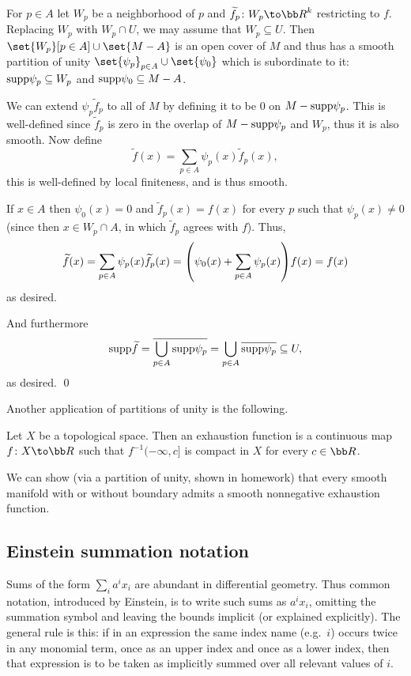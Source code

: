 \elemm

\bproof

    For $p\in A$ let $W_p$ be a neighborhood of $p$ and $\tilde f_p\colon W_p\to\bR^k$ restricting to $f$.
    Replacing $W_p$ with $W_p\cap U$, we may assume that $W_p\subseteq U$.
    Then $\set{W_p}[p\in A]\cup\set{M-A}$ is an open cover of $M$ and thus has a smooth partition of unity $\set{\psi_p}_{p\in A}\cup\set{\psi_0}$
    which is subordinate to it: ${\rm supp}\psi_p\subseteq W_p$ and ${\rm supp}\psi_0\subseteq M-A$.

    We can extend $\psi_p\tilde f_p$ to all of $M$ by defining it to be $0$ on $M-{\rm supp}\psi_p$.
    This is well-defined since $\tilde f_p$ is zero in the overlap of $M-{\rm supp}\psi_p$ and $W_p$, thus it is also smooth.
    Now define
    $$ \tilde f(x) = \sum_{p\in A}\psi_p(x)\tilde f_p(x) , $$
    this is well-defined by local finiteness, and is thus smooth.

    If $x\in A$ then $\psi_0(x)=0$ and $\tilde f_p(x)=f(x)$ for every $p$ such that $\psi_p(x)\neq0$ (since then $x\in W_p\cap A$, in which
    $\tilde f_p$ agrees with $f$).
    Thus,
    $$ \widetilde f(x) = \sum_{p\in A}\psi_p(x)\widetilde f_p(x) = \mathopen{}\mathclose{\left(\psi_0(x) + \sum_{p\in A}\psi_p(x)\right)}f(x) = f(x) $$
    as desired.

    And furthermore
    $$ {\rm supp}\widetilde f = \overline{\bigcup_{p\in A}{\rm supp}\psi_p} = \bigcup_{p\in A}\overline{{\rm supp}\psi_p} \subseteq U , $$
    as desired.
    \qed

\eproof

Another application of partitions of unity is the following.

\bdefn

    Let $X$ be a topological space.
    Then an {\emphcolor exhaustion function} is a continuous map $f\colon X\to\bR$ such that $f^{-1}(-\infty,c]$ is compact in $X$ for every
    $c\in\bR$.

\edefn

We can show (via a partition of unity, shown in homework) that every smooth manifold with or without boundary admits a smooth nonnegative
exhaustion function.

\subsection{Einstein summation notation}

Sums of the form $\sum_i a^ix_i$ are abundant in differential geometry.
Thus common notation, introduced by Einstein, is to write such sums as $a^ix_i$, omitting the summation symbol and leaving the bounds implicit
(or explained explicitly).
The general rule is this: if in an expression the same index name (e.g.\ $i$) occurs twice in any monomial term, once as an upper index and once as
a lower index, then that expression is to be taken as implicitly summed over all relevant values of $i$.

